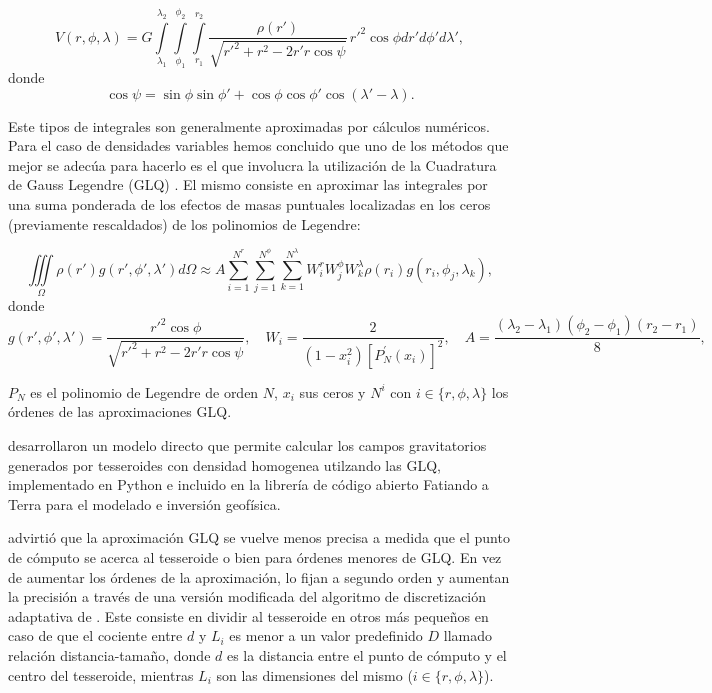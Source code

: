 \documentclass[a4paper,10pt]{article}
\begin{document}
\begin{equation}
    V(r,\phi,\lambda) = G 
    \int\limits_{\lambda_1}^{\lambda_2}
    \int\limits_{\phi_1}^{\phi_2}
    \int\limits_{r_1}^{r_2}
    \frac{\rho(r')}{\sqrt{{r'}^2 + r^2 - 2 r' r \cos \psi}} \, 
    r'^2 \cos \phi  dr' d\phi' d\lambda',
\label{eq:tesseroid-pot}
\end{equation}
\noindent donde
\begin{equation}
    \cos\psi = \sin\phi\sin\phi' + \cos\phi\cos\phi'
                 \cos(\lambda' - \lambda).
\label{eq:cospsi}
\end{equation}

Este tipos de integrales son generalmente aproximadas por cálculos numéricos.
Para el caso de densidades variables hemos concluido que uno de los métodos que mejor se adecúa para hacerlo es el que involucra la utilización de la Cuadratura de Gauss Legendre (GLQ) \citep{Asgharzadeh2007, Uieda2016, Uieda2017}.
El mismo consiste en aproximar las integrales por una suma ponderada de los efectos de masas puntuales localizadas en los ceros (previamente rescaldados) de los polinomios de Legendre:

\begin{equation}
    \iiint\limits_\Omega \rho(r') g(r', \phi', \lambda') d\Omega \approx
    A 
    \sum\limits_{i=1}^{N^r}
    \sum\limits_{j=1}^{N^\phi}
    \sum\limits_{k=1}^{N^\lambda}
    W_i^r W_j^\phi W_k^\lambda \rho(r_i) g(r_i, \phi_j, \lambda_k),
\label{eq:glq-var-dens}
\end{equation}
\noindent donde
\begin{equation}
    g(r', \phi', \lambda') =
    \frac{r'^2 \cos \phi}{\sqrt{{r'}^2 + r^2 - 2 r' r \cos \psi}},
    \quad
    W_i = \frac{2}{(1-x_i^2)[P_N^\prime(x_i)]^2},
    \quad
    A = \frac{(\lambda_2 - \lambda_1)(\phi_2 - \phi_1)(r_2 - r_1)}{8},
\end{equation}

\noindent $P_N$ es el polinomio de Legendre de orden $N$, $x_i$ sus ceros y $N^i$ con $i \in \{ r, \phi, \lambda\}$ los órdenes de las aproximaciones GLQ.

\citet{Uieda2016} desarrollaron un modelo directo que permite calcular los campos gravitatorios generados por tesseroides con densidad homogenea utilzando las GLQ, implementado en Python e incluido en la librería de código abierto Fatiando a Terra \citep{Uieda2013} para el modelado e inversión geofísica.

\citet{Ku1977} advirtió que la aproximación GLQ se vuelve menos precisa a medida que el punto de cómputo se acerca al tesseroide o bien para órdenes menores de GLQ.
En vez de aumentar los órdenes de la aproximación, \citet{Uieda2016} lo fijan a segundo orden y aumentan la precisión a través de una versión modificada del algoritmo de discretización adaptativa de \citet{Li2011}.
Este consiste en dividir al tesseroide en otros más pequeños en caso de que el cociente entre $d$ y $L_i$ es menor a un valor predefinido $D$ llamado relación distancia-tamaño, donde $d$ es la distancia entre el punto de cómputo y el centro del tesseroide, mientras $L_i$ son las dimensiones del mismo ($i \in \{ r, \phi, \lambda\}$).
\end{document}
